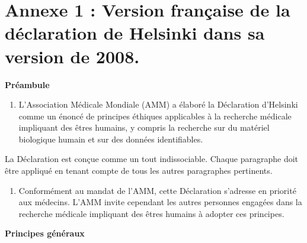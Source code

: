 \documentclass[
  12pt,
]{book}
\providecommand{\tightlist}{%
  \setlength{\itemsep}{0pt}\setlength{\parskip}{0pt}}
\begin{document}
\section{Annexe 1 : Version française de la déclaration de Helsinki dans sa version de 2008.}\label{annexe-1-version-franuxe7aise-de-la-duxe9claration-de-helsinki-dans-sa-version-de-2008.}

\textbf{Préambule}

\begin{enumerate}
\def\labelenumi{\arabic{enumi}.}
\tightlist
\item
  L'Association Médicale Mondiale (AMM) a élaboré la Déclaration d'Helsinki comme un énoncé de principes éthiques applicables à la recherche médicale impliquant des êtres humains, y compris la recherche sur du matériel biologique humain et sur des données identifiables.
\end{enumerate}

La Déclaration est conçue comme un tout indissociable. Chaque paragraphe doit être appliqué en tenant compte de tous les autres paragraphes pertinents.

\begin{enumerate}
\def\labelenumi{\arabic{enumi}.}
\setcounter{enumi}{1}
\tightlist
\item
  Conformément au mandat de l'AMM, cette Déclaration s'adresse en priorité aux médecins. L'AMM invite cependant les autres personnes engagées dans la recherche médicale impliquant des êtres humains à adopter ces principes.
\end{enumerate}

\textbf{Principes généraux}
\end{document}
